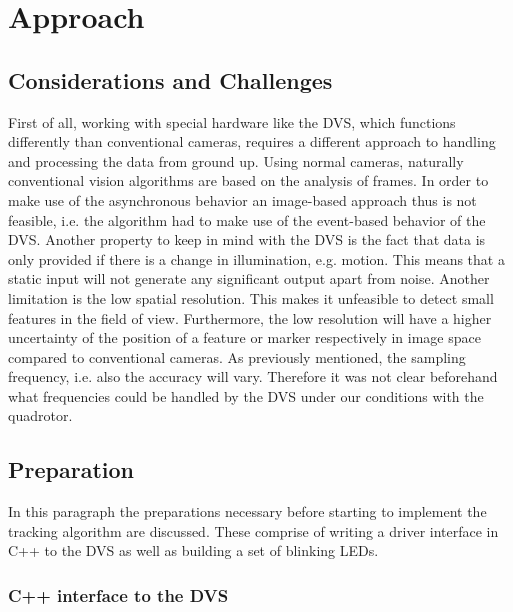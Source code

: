 \chapter{Approach}\label{sec:approach}

\section{Considerations and Challenges}\label{sec:considerations}

First of all, working with special hardware like the DVS, which functions differently than conventional cameras, requires a different approach to handling and processing the data from ground up. Using normal cameras, naturally conventional vision algorithms are based on the analysis of frames. In order to make use of the asynchronous behavior an image-based approach thus is not feasible, i.e. the algorithm had to make use of the event-based behavior of the DVS.
Another property to keep in mind with the DVS is the fact that data is only provided if there is a change in illumination, e.g. motion. This means that a static input will not generate any significant output apart from noise.
Another limitation is the low spatial resolution. This makes it unfeasible to detect small features in the field of view. Furthermore, the low resolution will have a higher uncertainty of the position of a feature or marker respectively in image space compared to conventional cameras.
As previously mentioned, the sampling frequency, i.e. also the accuracy will vary. Therefore it was not clear beforehand what frequencies could be handled by the DVS under our conditions with the quadrotor.

\section{Preparation}\label{sec:preparation}

In this paragraph the preparations necessary before starting to implement the tracking algorithm are discussed. These comprise of writing a driver interface in C++ to the DVS as well as building a set of blinking LEDs.

\subsection{C++ interface to the DVS}\label{sec:interface}

